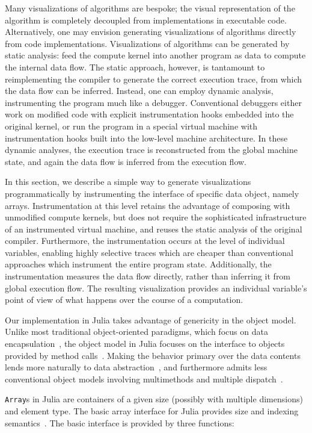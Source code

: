 \documentclass{sig-alternate}
\newcommand{\code}[1]{\texttt{#1}}
\begin{document}
Many visualizations of algorithms are bespoke; the visual representation of the
algorithm is completely decoupled from implementations in executable code.
Alternatively, one may envision generating visualizations of algorithms
directly from code implementations. Visualizations of algorithms can be
generated by static analysis: feed the compute kernel into another program as
data to compute the internal data flow. The static approach, however, is
tantamount to reimplementing the compiler to generate the correct execution
trace, from which the data flow can be inferred. Instead, one can employ
dynamic analysis, instrumenting the program much like a debugger. Conventional
debuggers either work on modified code with explicit instrumentation hooks
embedded into the original kernel, or run the program in a special virtual
machine with instrumentation hooks built into the low-level machine
architecture. In these dynamic analyses, the execution trace is reconstructed
from the global machine state, and again the data flow is inferred from the
execution flow.

In this section, we describe a simple way to generate visualizations
programmatically by instrumenting the interface of specific data object, namely
arrays. Instrumentation at this level retains the advantage of composing with
unmodified compute kernels, but does not require the sophisticated
infrastructure of an instrumented virtual machine, and reuses the static
analysis of the original compiler. Furthermore, the instrumentation occurs at
the level of individual variables, enabling highly selective traces
which are cheaper than conventional approaches which instrument the entire
program state. Additionally, the instrumentation measures the data flow
directly, rather than inferring it from global execution flow. The resulting
visualization provides an individual variable's point of view of what happens
over the course of a computation.

Our implementation in Julia takes advantage of genericity in the object model.
Unlike most traditional object-oriented paradigms, which focus on data
encapsulation~\cite{Cardelli1985}, the object model in Julia focuses on the
interface to objects provided by method calls~\cite{Mitchell1988}. Making the
behavior primary over the data contents lends more naturally to data
abstraction~\cite{Mitchell1988,Abadi1996}, and furthermore admits less conventional
object models involving multimethods and multiple dispatch~\cite{Castagna1997}.

\code{Array}s in Julia are containers of a given size (possibly with multiple
dimensions) and element type. The basic array interface for Julia provides size
and indexing semantics~\cite{Bezanson2014}. The basic interface is provided by
three functions:
\end{document}
